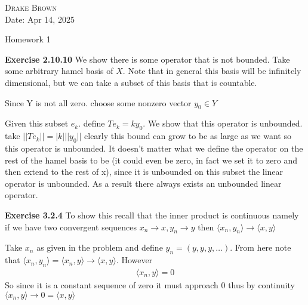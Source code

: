 \documentclass[12pt]{article}
\newenvironment{exercise}[1]{\vspace{.1in}\noindent\textbf{Exercise #1 \hspace{.05em}}}{}
\theoremstyle{definition}
\theoremstyle{remark}
\begin{document}
\begin{flushright}
	\textsc{Drake Brown}  \\
	Date: Apr 14, 2025
\end{flushright}
\begin{center}
	Homework 1
\end{center}

\begin{exercise}{2.10.10}
	We show there is some operator that is not bounded. Take some arbitrary hamel basis of $X$. Note that in general this basis will be infinitely dimensional, but we can take a subset of this basis that is countable.

	Since Y is not all zero. choose some nonzero vector $y_0\in Y$

	Given this subset $e_k$. define $Te_k=ky_0$. We show that this operator is unbounded. take $||Te_k||=|k|||y_0||$ clearly this bound can grow to be as large as we want so this operator is unbounded. It doesn't matter what we define the operator on the rest of the hamel basis to be (it could even be zero, in fact we set it to zero and then extend to the rest of x), since it is unbounded on this subset the linear operator is unbounded. As a result there always exists an unbounded linear operator.
\end{exercise}

\begin{exercise}{3.2.4}
	To show this recall that the inner product is continuous namely if we have two convergent sequences $x_n\rightarrow x,y_n\rightarrow y$ then $\langle x_n, y_n\rangle \rightarrow \langle x, y\rangle $

	Take $x_n$ as given in the problem and define $y_n=(y,y,y,\dots)$. From here note that $\langle x_n,y_n\rangle = \langle x_n, y\rangle \rightarrow \langle x, y\rangle $. However
	\begin{align}
		\langle x_n, y\rangle =0
	\end{align}
	So since it is a constant sequence of zero it must approach $0$ thus by continuity $\langle x_n, y\rangle \rightarrow 0=\langle x, y\rangle $
\end{exercise}
\end{document}
